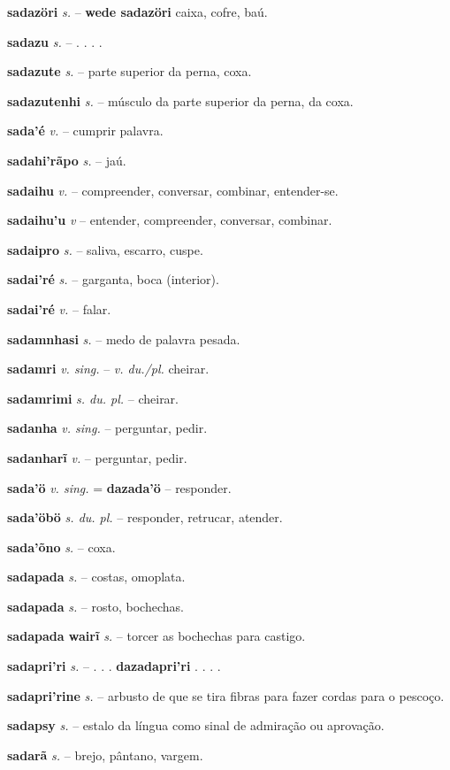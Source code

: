 \textbf{sadazöri} \textit{s.} -- \textbf{wede sadazöri} caixa, cofre, baú.

\textbf{sadazu} \textit{s.} -- . . . .

\textbf{sadazute} \textit{s.} -- parte superior da perna, coxa.

\textbf{sadazutenhi} \textit{s.} -- músculo da parte superior da perna, da coxa.

\textbf{sada'é} \textit{v.} -- cumprir palavra.

\textbf{sadahi'rãpo} \textit{s.} -- jaú.

\textbf{sadaihu} \textit{v.} -- compreender, conversar, combinar, entender-se.

\textbf{sadaihu'u} \textit{v} -- entender, compreender, conversar, combinar.

\textbf{sadaipro} \textit{s.} -- saliva, escarro, cuspe.

\textbf{sadai'ré} \textit{s.} -- garganta, boca (interior).

\textbf{sadai'ré} \textit{v.} -- falar.

\textbf{sadamnhasi} \textit{s.} -- medo de palavra pesada.

\textbf{sadamri} \textit{v. sing.} -- \textit{v. du./pl.} cheirar.

\textbf{sadamrimi} \textit{s. du. pl.} -- cheirar.

\textbf{sadanha} \textit{v. sing.} -- perguntar, pedir.

\textbf{sadanharĩ} \textit{v.} -- perguntar, pedir.

\textbf{sada'ö} \textit{v. sing.} = \textbf{dazada'ö} -- responder.

\textbf{sada'öbö} \textit{s. du. pl.} -- responder, retrucar, atender.

\textbf{sada'õno} \textit{s.} -- coxa.

\textbf{sadapada} \textit{s.} -- costas, omoplata.

\textbf{sadapada} \textit{s.} -- rosto, bochechas.

\textbf{sadapada wairĩ} \textit{s.} -- torcer as bochechas para castigo.

\textbf{sadapri'ri} \textit{s.} -- . . . \textbf{dazadapri'ri} . . . .

\textbf{sadapri'rine} \textit{s.} -- arbusto de que se tira fibras para fazer cordas para o pescoço.

\textbf{sadapsy} \textit{s.} -- estalo da língua como sinal de admiração ou aprovação.

\textbf{sadarã} \textit{s.} -- brejo, pântano, vargem.

